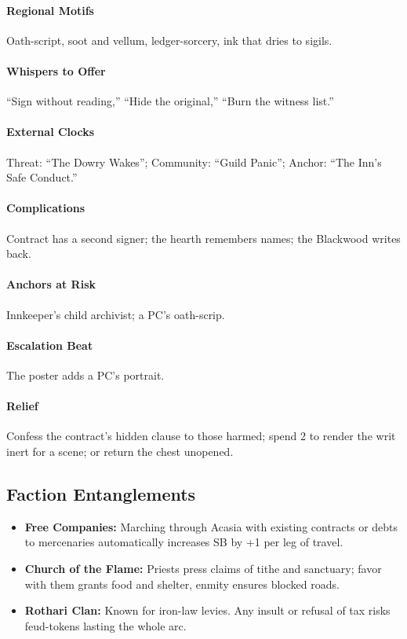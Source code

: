 \paragraph{Regional Motifs} Oath-script, soot and vellum, ledger-sorcery, ink that dries to sigils.
\paragraph{Whispers to Offer} ``Sign without reading,'' ``Hide the original,'' ``Burn the witness list.''
\paragraph{External Clocks} Threat: ``The Dowry Wakes''; Community: ``Guild Panic''; Anchor: ``The Inn’s Safe Conduct.''
\paragraph{Complications} Contract has a second signer; the hearth remembers names; the Blackwood writes back.
\paragraph{Anchors at Risk} Innkeeper’s child archivist; a PC’s oath-scrip.
\paragraph{Escalation Beat} The poster adds a PC’s portrait.
\paragraph{Relief} Confess the contract’s hidden clause to those harmed; spend 2 \Boons{} to render the writ inert for a scene; or return the chest unopened.

\subsection*{Faction Entanglements}
\begin{itemize}
  \item \textbf{Free Companies:} Marching through Acasia with existing contracts or debts to mercenaries automatically increases SB by +1 per leg of travel.
  \item \textbf{Church of the Flame:} Priests press claims of tithe and sanctuary; favor with them grants food and shelter, enmity ensures blocked roads.
  \item \textbf{Rothari Clan:} Known for iron-law levies. Any insult or refusal of tax risks feud-tokens lasting the whole arc.
\end{itemize}

